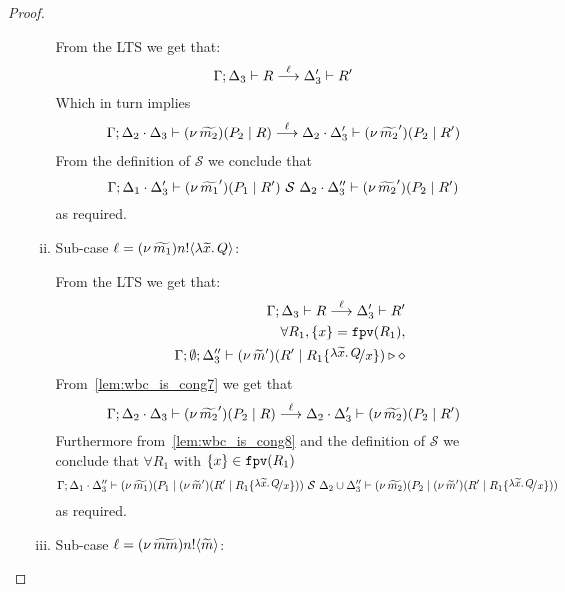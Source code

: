 \begin{proof}
\begin{enumerate}
\begin{enumerate}[i.]
							\noi From the LTS we get that:
							\[
								\Gamma; \Delta_3 \vdash R \stackrel{\ell}{\longrightarrow} \Delta_3' \vdash R'
							\]
							\noi Which in turn implies
							\begin{eqnarray*}
								\Gamma; \Delta_2 \cdot \Delta_3 \vdash (\nu\, \widetilde{m_2})(P_2 \;|\; R) \stackrel{\ell}{\longrightarrow} \Delta_2 \cdot \Delta_3' \vdash (\nu\, \widetilde{m_2}')(P_2 \;|\; R')
							\end{eqnarray*}
							\noi From the definition of $\mathcal{S}$ we conclude that
							\[
								\Gamma; \Delta_1 \cdot \Delta_3' \vdash (\nu\, \widetilde{m_1}')(P_1 \;|\; R') \ \mathcal{S}\  \Delta_2 \cdot \Delta_3'' \vdash (\nu\, \widetilde{m_2}')(P_2 \;|\; R')
							\]
							\noi as required.

				\item	Sub-case $\ell = (\nu\, \widetilde{m_1}) n ! \langle \lambda \widetilde{x}.\,Q \rangle$:

						\noi From the LTS we get that:
						\begin{eqnarray}
							& &	\horel{\Gamma}{\Delta_3}{R}{\by{\ell}}{\Delta_3'}{R'}
								\label{lem:wbc_is_cong7}\\
							& & 	\forall R_1, \set{x} = \fpv{R_1},
								\nonumber\\
							& &	\Gamma; \emptyset; \Delta_3'' \proves \newsp{\widetilde{m}'}{R' \Par R_1 \subst{\abs{\widetilde{x}}{Q}}{x}} \hastype \Proc
								\label{lem:wbc_is_cong8}
						\end{eqnarray}
						\noi From~\eqref{lem:wbc_is_cong7} we get that
						\[
							\Gamma; \Delta_2 \cdot \Delta_3 \vdash (\nu\, \widetilde{m_2}')(P_2 \;|\; R) \stackrel{\ell}{\longrightarrow} \Delta_2 \cdot \Delta_3' \vdash (\nu\, \widetilde{m_2})(P_2 \;|\; R')
						\]
						\noi Furthermore from~\eqref{lem:wbc_is_cong8} and the definition of $\mathcal{S}$ we conclude that
						$\forall R_1$ with $\{x\} \in \mathtt{fpv}(R_1)$
						\[
							\horel{\Gamma}{\Delta_1 \cat \Delta_3''}{\newsp{\widetilde{m_1}}{P_1 \Par \newsp{\widetilde{m}'}{R' \Par R_1 \subst{\abs{\widetilde{x}}{Q}}{x}}}}
							{\ \mathcal{S}\ }
							{\Delta_2 \cup \Delta_3''}{\newsp{\widetilde{m_2}}{P_2 \Par \newsp{\widetilde{m}'}{R' \Par R_1 \subst{\abs{\widetilde{x}}{Q}}{x}}}}
						\]
						\noi as required.

				\item	Sub-case $\ell = (\nu\, \widetilde{mm}) n ! \langle \widetilde{m} \rangle$:


\end{enumerate}
\end{enumerate}
\end{proof}
